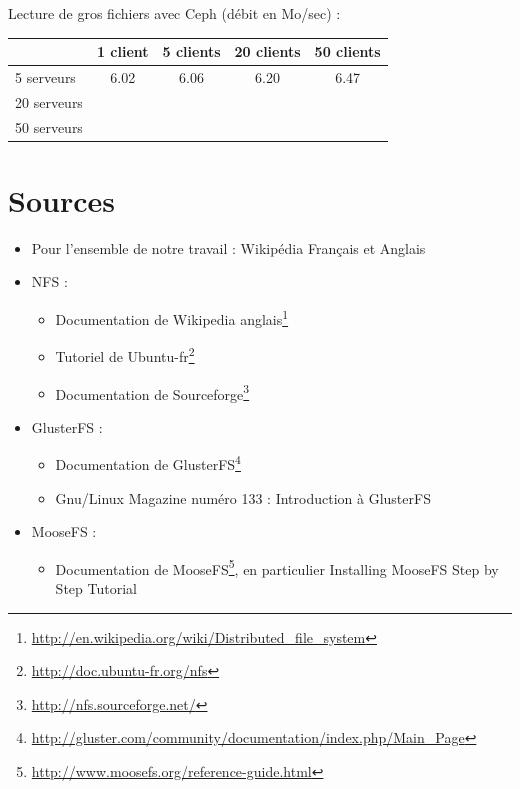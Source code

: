 \documentclass[12pt]{report}
\begin{document}
			Lecture de gros fichiers avec Ceph (débit en Mo/sec) :

			\begin{tabular}{|l|c|c|c|c|}
				\hline
				& 1 client & 5 clients & 20 clients & 50 clients \\
				\hline
				5 serveurs & 6.02 & 6.06 & 6.20 & 6.47 \\
				\hline
				20 serveurs & & & & \\
				\hline
				50 serveurs & & & & \\
				\hline
			\end{tabular}

		\chapter{Sources}
     \label{Sources}
			\begin{itemize}
				\item Pour l'ensemble de notre travail : Wikipédia Français et Anglais
				\item NFS :
				\begin{itemize}
				  \item Documentation de Wikipedia anglais\footnote{\href{http://en.wikipedia.org/wiki/Distributed\_file\_system}{http://en.wikipedia.org/wiki/Distributed\_file\_system}}
				  \item Tutoriel de Ubuntu-fr\footnote{\href{http://doc.ubuntu-fr.org/nfs}{http://doc.ubuntu-fr.org/nfs}}
				  \item Documentation de Sourceforge\footnote{\href{http://nfs.sourceforge.net/}{http://nfs.sourceforge.net/}}
				\end{itemize}
				\item GlusterFS :
				\begin{itemize}
					\item Documentation de GlusterFS\footnote{\href{http://gluster.com/community/documentation/index.php/Main\_Page}
					{http://gluster.com/community/documentation/index.php/Main\_Page}}
					\item Gnu/Linux Magazine numéro 133 : \og Introduction à GlusterFS\fg
				\end{itemize}
				\item MooseFS :
				\begin{itemize}
					\item Documentation de MooseFS\footnote{\href{http://www.moosefs.org/reference-guide.html}{http://www.moosefs.org/reference-guide.html}}, en particulier
					\og Installing MooseFS Step by Step Tutorial\fg

\end{itemize}
\end{itemize}
\end{document}
